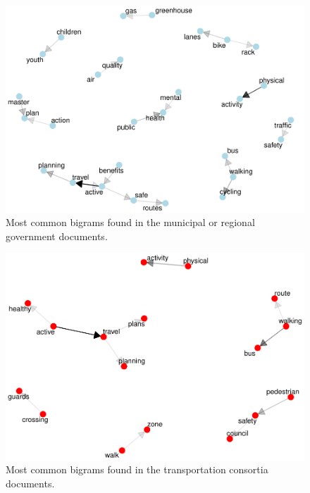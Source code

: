 \documentclass[]{elsarticle} %
\begin{document}
\begin{figure}

{\centering \includegraphics[width=1\linewidth]{AST-Framing-Ontario_files/figure-latex/city-visual-1} 

}

\caption{Most common bigrams found in the municipal or regional government documents.}\label{fig:city-visual}
\end{figure}

\begin{figure}

{\centering \includegraphics[width=1\linewidth]{AST-Framing-Ontario_files/figure-latex/consortia-visual-1} 

}

\caption{Most common bigrams found in the transportation consortia documents.}\label{fig:consortia-visual}
\end{figure}
\end{document}
